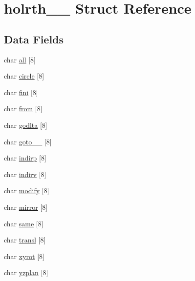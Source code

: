 \hypertarget{structholrth__1__}{}\section{holrth\+\_\+\_\+ Struct Reference}
\label{structholrth__1__}
\subsection*{Data Fields}
\begin{DoxyCompactItemize}
\item 
char \hyperlink{structholrth__1___aea8a206994514a9403a792499928c345}{all} \mbox{[}8\mbox{]}
\item 
char \hyperlink{structholrth__1___a1db55898de24c29a18cf8e64d7800337}{circle} \mbox{[}8\mbox{]}
\item 
char \hyperlink{structholrth__1___a426aaf4cb192f5ff20c95a3c053c49ba}{fini} \mbox{[}8\mbox{]}
\item 
char \hyperlink{structholrth__1___a5a8f1fcb126ae5a08fe83223f3b7e2a0}{from} \mbox{[}8\mbox{]}
\item 
char \hyperlink{structholrth__1___ac35da7076f67b1c539c94c1731c78345}{godlta} \mbox{[}8\mbox{]}
\item 
char \hyperlink{structholrth__1___a3e38dfe5d4be16968bad72a77e28af83}{goto\+\_\+\+\_\+} \mbox{[}8\mbox{]}
\item 
char \hyperlink{structholrth__1___accf4d56d20f16cba29fc5ccdcf6b4f83}{indirp} \mbox{[}8\mbox{]}
\item 
char \hyperlink{structholrth__1___ae20c851f7f49813c20e15709a3f3b10b}{indirv} \mbox{[}8\mbox{]}
\item 
char \hyperlink{structholrth__1___a25c071912cb20bc10c649424d8474134}{modify} \mbox{[}8\mbox{]}
\item 
char \hyperlink{structholrth__1___a09468539aa48054eb4a8327c14efdee4}{mirror} \mbox{[}8\mbox{]}
\item 
char \hyperlink{structholrth__1___a98042573408a9319f728682dde2a8688}{same} \mbox{[}8\mbox{]}
\item 
char \hyperlink{structholrth__1___afc1ca9e1bca3d750954f492d426472a5}{transl} \mbox{[}8\mbox{]}
\item 
char \hyperlink{structholrth__1___a16f9b674e9d40afc84f699500bfd0992}{xyrot} \mbox{[}8\mbox{]}
\item 
char \hyperlink{structholrth__1___ada529c4e51d5cb9af737179577610b15}{yzplan} \mbox{[}8\mbox{]}
\item 

\end{DoxyCompactItemize}
